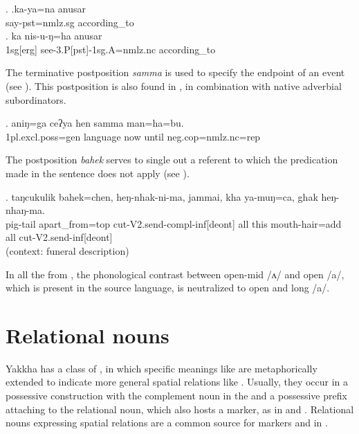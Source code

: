 \ex. \ag.ka-ya=na                   anusar\\
say{\sc [3sg]-pst=nmlz.sg} according\_to\\
 
\bg.  ka       nis-u-ŋ=ha                                  anusar\\
{\sc 1sg[erg]} see{\sc -3.P[pst]-1sg.A=nmlz.nc} according\_to\\
 

The terminative postposition \emph{samma}   is used to specify the endpoint of an event (see \Next). This postposition is also found in , in combination with native adverbial subordinators.

\exg. aniŋ=ga            ceʔya   hen samma      man=ha=bu.\\
{\sc 1pl.excl.poss=gen}  language now until {\sc neg.cop=nmlz.nc=rep}\\
 

The  postposition \emph{bahek}   serves to single out a referent to which the predication made in the sentence does not apply (see \Next). 

\exg. taŋcukulik bahek=chen, heŋ-nhak-ni-ma, jammai, kha  ya-muŋ=ca, ghak heŋ-nhaŋ-ma.\\
pig-tail apart\_from{\sc =top} cut{\sc -V2.send-compl-inf[deont]} all this mouth-hair{\sc =add} all cut{\sc -V2.send-inf[deont]}\\
 (context: funeral description) 


In all the  from , the phonological contrast between open-mid /ʌ/ and open /a/, which is present in the source language, is neutralized to open and long /a/.

 
\section{Relational nouns}\label{postpos-2}
  
  Yakkha has a class of , in which  specific meanings like  are metaphorically extended to indicate more general spatial relations like . Usually, they occur in a possessive construction with the complement noun in the  and a possessive prefix attaching to the relational noun, which also hosts a   marker, as in  \Next[a] and \Next[b]. Relational nouns expressing spatial relations are a common source for  markers and  in  \citep[62]{DeLancey1985_Etymological}.
  
